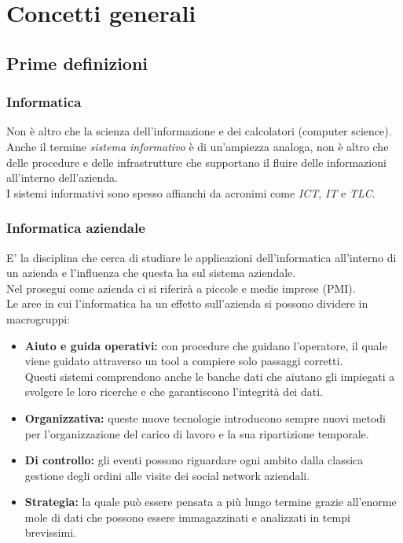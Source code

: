 \documentclass[../main.tex]{subfiles}
\begin{document}
	\chapter{Concetti generali}
	\section{Prime definizioni}
	\subsection{Informatica}
	Non è altro che la scienza dell'informazione e dei calcolatori (computer science).\\
	Anche il termine \emph{sistema informativo} è di un'ampiezza analoga, non è altro che delle procedure e delle infrastrutture che supportano il fluire delle informazioni all'interno dell'azienda.\\
	I sistemi informativi sono spesso affianchi da acronimi come \emph{ICT}, \emph{IT} e \emph{TLC}.
	\subsection{Informatica aziendale}
	E' la disciplina che cerca di studiare le applicazioni dell'informatica all'interno di un azienda e l'influenza che questa ha sul sistema aziendale.\\
	Nel prosegui come azienda ci si riferirà a piccole e medie imprese (PMI).\\
	Le aree in cui l'informatica ha un effetto sull'azienda si possono dividere in macrogruppi:
	\begin{itemize}
		\item \textbf{Aiuto e guida operativi:} con procedure che guidano l'operatore, il quale viene guidato   attraverso un tool a compiere solo passaggi corretti.\\
			Questi sistemi comprendono anche le banche dati che aiutano gli impiegati a svolgere le loro ricerche e che garantiscono l'integrità dei dati.
		\item \textbf{Organizzativa:} queste nuove tecnologie introducono sempre nuovi metodi per l'organizzazione del carico di lavoro e la sua ripartizione temporale.
		\item \textbf{Di controllo:} gli eventi possono riguardare ogni ambito dalla classica gestione degli ordini alle visite dei social network aziendali.
		\item \textbf{Strategia:} la quale può essere pensata a più lungo termine grazie all'enorme mole di dati che possono essere immagazzinati e analizzati in tempi brevissimi.
	\end{itemize}
\end{document}
